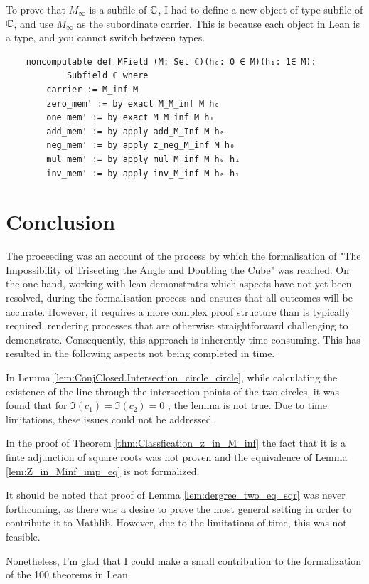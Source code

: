To prove that $M_{\infty}$ is a subfile of $\mathbb{C}$, I had to define a new object of type subfile of $\mathbb{C}$, and use $M_{\infty}$ as the subordinate carrier.
This is because each object in Lean is a type, and you cannot switch between types.
\begin{lstlisting}
    noncomputable def MField (M: Set ℂ)(h₀: 0 ∈ M)(h₁: 1∈ M):
            Subfield ℂ where
        carrier := M_inf M
        zero_mem' := by exact M_M_inf M h₀
        one_mem' := by exact M_M_inf M h₁
        add_mem' := by apply add_M_Inf M h₀
        neg_mem' := by apply z_neg_M_inf M h₀
        mul_mem' := by apply mul_M_inf M h₀ h₁
        inv_mem' := by apply inv_M_inf M h₀ h₁
\end{lstlisting}

\section{Conclusion}
The proceeding was an account of the process by which the formalisation of "The Impossibility of Trisecting the Angle and Doubling the Cube" was reached. 
On the one hand, working with lean demonstrates which aspects have not yet been resolved, during the formalisation process and ensures that all outcomes will be accurate. 
However, it requires a more complex proof structure  than is typically required, rendering processes that are otherwise straightforward challenging to demonstrate.
Consequently, this approach is inherently time-consuming. 
This has resulted in the following aspects not being completed in time.

In Lemma \ref{lem:ConjClosed.Intersection_circle_circle}, while calculating the existence of the line through the intersection points of the two circles, it was found that for $\Im (c_1) = \Im (c_2) = 0$ , the lemma is not true.
Due to time limitations, these issues could not be addressed.

In the proof of Theorem \ref{thm:Classfication_z_in_M_inf} the fact that it is a finte adjunction of square roots was not proven and the equivalence of Lemma \ref{lem:Z_in_Minf_imp_eq} is not formalized.

It should be noted that proof of Lemma \ref{lem:dergree_two_eq_sqr} was never forthcoming, as there was a desire to prove the most general setting in order to contribute it to Mathlib.
However, due to the limitations of time, this was not feasible.

Nonetheless, I'm glad that I could make a small contribution to the formalization of the 100 theorems in Lean.